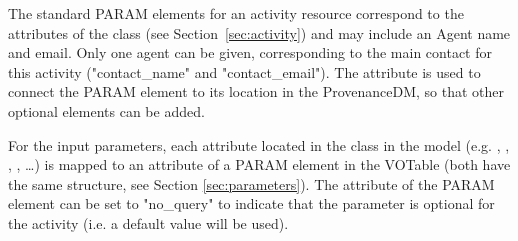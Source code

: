 
The standard PARAM elements for an activity resource correspond to the attributes of the  class (see Section~\ref{sec:activity}) and may include an Agent name and email. Only one agent can be given, corresponding to the main contact for this activity ("contact\_name" and "contact\_email"). 
The  attribute is used to connect the PARAM element to its location in the ProvenanceDM, so that other optional elements can be added.

For the input parameters, each attribute located in the  class in the model (e.g. , , , , \dots) is mapped to an attribute of a PARAM element in the VOTable (both have the same structure, see Section \ref{sec:parameters}).
The  attribute of the PARAM element can be set to "no\_query" to indicate that the parameter is optional for the activity (i.e. a default value will be used).



